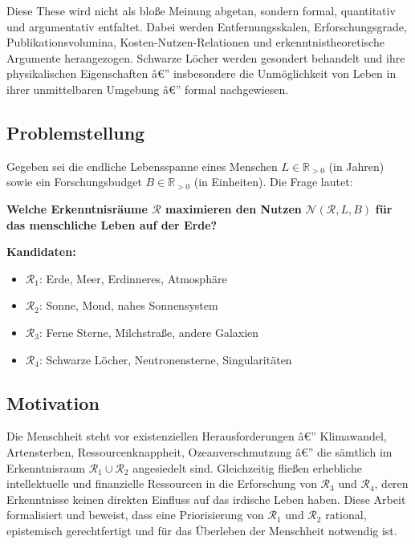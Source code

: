 ﻿\documentclass[a4paper,12pt]{article}
\theoremstyle{definition}
\begin{document}
Diese These wird nicht als bloße Meinung abgetan, sondern formal, quantitativ
und argumentativ entfaltet. Dabei werden Entfernungsskalen, Erforschungsgrade,
Publikationsvolumina, Kosten-Nutzen-Relationen und erkenntnistheoretische
Argumente herangezogen. Schwarze Löcher werden gesondert behandelt und ihre
physikalischen Eigenschaften â€” insbesondere die Unmöglichkeit von Leben in
ihrer unmittelbaren Umgebung â€” formal nachgewiesen.

\subsection{Problemstellung}

Gegeben sei die endliche Lebensspanne eines Menschen $L \in \mathbb{R}_{>0}$
(in Jahren) sowie ein Forschungsbudget $B \in \mathbb{R}_{>0}$ (in
Einheiten). Die Frage lautet:

\begin{center}
\textbf{Welche Erkenntnisräume $\mathcal{R}$ maximieren den Nutzen}
$\mathcal{N}(\mathcal{R}, L, B)$ \textbf{für das menschliche Leben auf der Erde?}
\end{center}

\textbf{Kandidaten:}
\begin{itemize}
    \item $\mathcal{R}_1$: Erde, Meer, Erdinneres, Atmosphäre
    \item $\mathcal{R}_2$: Sonne, Mond, nahes Sonnensystem
    \item $\mathcal{R}_3$: Ferne Sterne, Milchstraße, andere Galaxien
    \item $\mathcal{R}_4$: Schwarze Löcher, Neutronensterne, Singularitäten
\end{itemize}

\subsection{Motivation}

Die Menschheit steht vor existenziellen Herausforderungen â€” Klimawandel,
Artensterben, Ressourcenknappheit, Ozeanverschmutzung â€” die sämtlich im
Erkenntnisraum $\mathcal{R}_1 \cup \mathcal{R}_2$ angesiedelt sind. Gleichzeitig
fließen erhebliche intellektuelle und finanzielle Ressourcen in die Erforschung
von $\mathcal{R}_3$ und $\mathcal{R}_4$, deren Erkenntnisse keinen direkten
Einfluss auf das irdische Leben haben. Diese Arbeit formalisiert und beweist,
dass eine Priorisierung von $\mathcal{R}_1$ und $\mathcal{R}_2$ rational,
epistemisch gerechtfertigt und für das Überleben der Menschheit notwendig ist.
\end{document}

